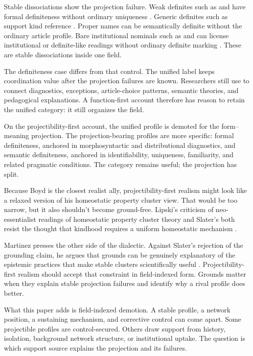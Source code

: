 \documentclass[12pt]{article}
\begin{document}
Stable dissociations show the projection failure. Weak definites such as  and  have formal definiteness without ordinary uniqueness \citep{carlsonsussman2005,aguilarguevarazwarts2010}. Generic definites such as  support kind reference \citep{KrifkaEtAl1995}. Proper names can be semantically definite without the ordinary article profile. Bare institutional nominals such as  and  can license institutional or definite-like readings without ordinary definite marking \citep{reynolds2025definiteness}. These are stable dissociations inside one field.

The definiteness case differs from that control. The unified label keeps coordination value after the projection failures are known. Researchers still use  to connect diagnostics, exceptions, article-choice patterns, semantic theories, and pedagogical explanations. A function-first account therefore has reason to retain the unified category: it still organizes the field.

On the projectibility-first account, the unified profile is demoted for the form--meaning projection. The projection-bearing profiles are more specific: formal definiteness, anchored in morphosyntactic and distributional diagnostics, and semantic definiteness, anchored in identifiability, uniqueness, familiarity, and related pragmatic conditions. The category remains useful; the projection has split.

Because Boyd is the closest realist ally, projectibility-first realism might look like a relaxed version of his homeostatic property cluster view. That would be too narrow, but it also shouldn't become ground-free. Lipski's criticism of neo-essentialist readings of homeostatic property cluster theory and Slater's  both resist the thought that kindhood requires a uniform homeostatic mechanism \citep{lipski2020,slater2015}.

Martinez presses the other side of the dialectic. Against Slater's rejection of the grounding claim, he argues that grounds can be genuinely explanatory of the epistemic practices that make stable clusters scientifically useful \citep{martinez_2017_stable_property_clusters_grounds}. Projectibility-first realism should accept that constraint in field-indexed form. Grounds matter when they explain stable projection failures and identify why a rival profile does better.

What this paper adds is field-indexed demotion. A stable profile, a network position, a sustaining mechanism, and corrective control can come apart. Some projectible profiles are control-secured. Others draw support from history, isolation, background network structure, or institutional uptake. The question is which support source explains the projection and its failures.
\end{document}
